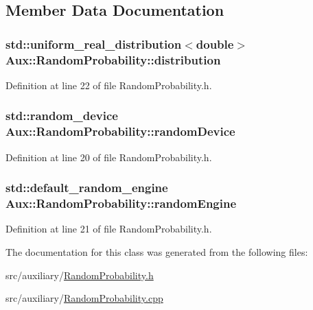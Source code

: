 \subsection{Member Data Documentation}
\hypertarget{class_aux_1_1_random_probability_aea37d3428c64a4d88cfec092f1fa5d85}{
\subsubsection[{distribution}]{\setlength{\rightskip}{0pt plus 5cm}std\-::uniform\-\_\-real\-\_\-distribution$<$double$>$ Aux\-::\-Random\-Probability\-::distribution\hspace{0.3cm}{\ttfamily [protected]}}}\label{class_aux_1_1_random_probability_aea37d3428c64a4d88cfec092f1fa5d85}


Definition at line 22 of file Random\-Probability.\-h.

\hypertarget{class_aux_1_1_random_probability_ae714dbdb46cb0ab965d2e2f544f9ad4a}{
\subsubsection[{random\-Device}]{\setlength{\rightskip}{0pt plus 5cm}std\-::random\-\_\-device Aux\-::\-Random\-Probability\-::random\-Device\hspace{0.3cm}{\ttfamily [protected]}}}\label{class_aux_1_1_random_probability_ae714dbdb46cb0ab965d2e2f544f9ad4a}


Definition at line 20 of file Random\-Probability.\-h.

\hypertarget{class_aux_1_1_random_probability_af8f4edb5271507e52daad5b0ceff1680}{
\subsubsection[{random\-Engine}]{\setlength{\rightskip}{0pt plus 5cm}std\-::default\-\_\-random\-\_\-engine Aux\-::\-Random\-Probability\-::random\-Engine\hspace{0.3cm}{\ttfamily [protected]}}}\label{class_aux_1_1_random_probability_af8f4edb5271507e52daad5b0ceff1680}


Definition at line 21 of file Random\-Probability.\-h.



The documentation for this class was generated from the following files\-:\begin{DoxyCompactItemize}
\item 
src/auxiliary/\hyperlink{_random_probability_8h}{Random\-Probability.\-h}\item 
src/auxiliary/\hyperlink{_random_probability_8cpp}{Random\-Probability.\-cpp}\end{DoxyCompactItemize}
